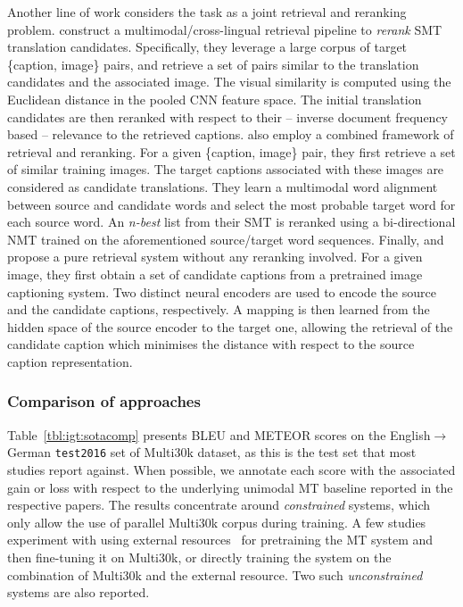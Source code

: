 \documentclass{svjour3}
\newcommand{\lp}[2]{#1$\rightarrow$#2}
\begin{document}
Another line of work considers the task as a joint retrieval and reranking problem. \citet{hitschler-2016-multimodal} construct a multimodal/cross-lingual retrieval pipeline to \textit{rerank} SMT translation candidates. Specifically, they leverage a large corpus of target \{caption, image\} pairs, and retrieve a set of pairs similar to the translation candidates and the associated image. The visual similarity is computed using the Euclidean distance in the pooled CNN feature space. The initial translation candidates are then reranked with respect to their  -- inverse document frequency based -- relevance to the retrieved captions.
\citet{zhang-EtAl:2017:WMT2} also employ a combined framework of retrieval and reranking.
For a given \{caption, image\} pair, they first retrieve a set of similar training images. The target captions associated with these images are considered as candidate translations. They learn a multimodal word alignment between source and candidate words
and select the most probable target word for each source word. An \textit{n-best} list 
from their SMT is reranked using a bi-directional NMT trained on the aforementioned source/target word sequences. Finally, \citet{duselis-EtAl:2017:WMT} and \citet{gwinnup-EtAl:2018:WMT2} propose a pure retrieval system without any reranking involved. For a given image, they first obtain a set of candidate captions from a pretrained image captioning system. Two distinct neural encoders are  used to encode the source and the candidate captions, respectively. A mapping is then learned from the hidden space of the source encoder to the target one, allowing the retrieval of the candidate caption which minimises the distance with respect to the source caption representation.







\subsubsection{Comparison of approaches}
\label{sec:tasks:ict:comp}
Table~\ref{tbl:igt:sotacomp} presents BLEU and METEOR scores on the \lp{English}{German} \texttt{test2016} set of Multi30k dataset, as this is the test set that most studies report against. When possible, we annotate each score with the associated gain or loss with respect to the underlying unimodal MT baseline reported in the respective papers. The results concentrate around \textit{constrained} systems, which only allow the use of parallel Multi30k corpus during training. A few studies experiment with using external resources~\citep{calixto-doubly-2017,helcl-libovicky:2017:WMT,elliott-imagination-2017,gronroos-memad-2018} for pretraining the MT system and then fine-tuning it on Multi30k, or directly training the system on the combination of Multi30k and the external resource. Two such \textit{unconstrained} systems are also reported.
\end{document}
